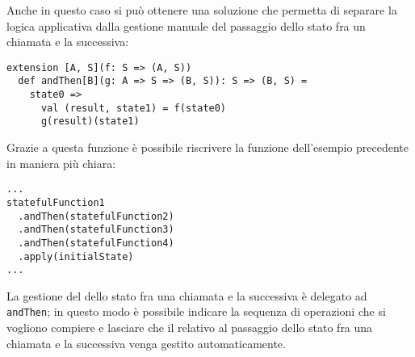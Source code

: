Anche in questo caso si può ottenere una soluzione che permetta di separare la logica applicativa dalla gestione manuale del passaggio dello stato fra un chiamata e la successiva:
\begin{lstlisting}[language=scala3]
extension [A, S](f: S => (A, S))
  def andThen[B](g: A => S => (B, S)): S => (B, S) =
    state0 => 
      val (result, state1) = f(state0)
      g(result)(state1)
\end{lstlisting}
Grazie a questa funzione è possibile riscrivere la funzione dell'esempio precedente in maniera più chiara:
\begin{lstlisting}[language=scala3]
...
statefulFunction1
  .andThen(statefulFunction2)
  .andThen(statefulFunction3)
  .andThen(statefulFunction4)
  .apply(initialState)
...
\end{lstlisting}
La gestione del  dello stato fra una chiamata e la successiva è delegato ad \lstinline{andThen}; in questo modo è possibile indicare la sequenza di operazioni che si vogliono compiere e lasciare che il  relativo al passaggio dello stato fra una chiamata e la successiva venga gestito automaticamente.
